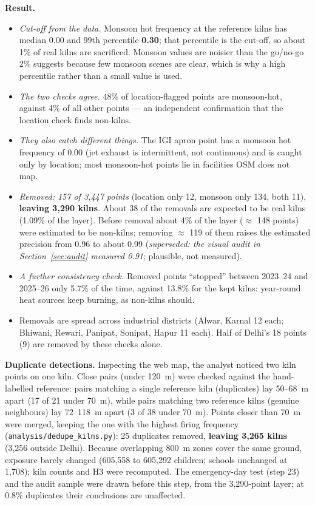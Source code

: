 \documentclass[11pt,a4paper]{article}
\begin{document}
\textbf{Result.}
\begin{itemize}[leftmargin=*]
\item \emph{Cut-off from the data.} Monsoon hot frequency at the reference kilns
has median 0.00 and 99th percentile \textbf{0.30}; that percentile is the
cut-off, so about 1\% of real kilns are sacrificed. Monsoon values are noisier
than the go/no-go 2\% suggests because few monsoon scenes are clear, which is
why a high percentile rather than a small value is used.
\item \emph{The two checks agree.} 48\% of location-flagged points are
monsoon-hot, against 4\% of all other points --- an independent confirmation
that the location check finds non-kilns.
\item \emph{They also catch different things.} The IGI apron point has a monsoon
hot frequency of 0.00 (jet exhaust is intermittent, not continuous) and is caught
only by location; most monsoon-hot points lie in facilities OSM does not map.
\item \emph{Removed: 157 of 3{,}447 points} (location only 12, monsoon only 134,
both 11), \textbf{leaving 3{,}290 kilns}. About 38 of the removals are expected
to be real kilns (1.09\% of the layer). Before removal about 4\% of the layer
($\approx$ 148 points) were estimated to be non-kilns; removing $\approx$ 119
of them raises the estimated precision from 0.96 to about 0.99 (\emph{superseded:
the visual audit in Section~\ref{sec:audit} measured 0.91}; plausible, not
measured).
\item \emph{A further consistency check.} Removed points ``stopped'' between
2023--24 and 2025--26 only 5.7\% of the time, against 13.8\% for the kept
kilns: year-round heat sources keep burning, as non-kilns should.
\item Removals are spread across industrial districts (Alwar, Karnal 12 each;
Bhiwani, Rewari, Panipat, Sonipat, Hapur 11 each). Half of Delhi's 18 points
(9) are removed by these checks alone.
\end{itemize}
\textbf{Duplicate detections.} Inspecting the web map, the analyst noticed two
kiln points on one kiln. Close pairs (under 120~m) were checked against the
hand-labelled reference: pairs matching a single reference kiln (duplicates) lay
50--68~m apart (17 of 21 under 70~m), while pairs matching two reference kilns
(genuine neighbours) lay 72--118~m apart (3 of 38 under 70~m). Points closer
than 70~m were merged, keeping the one with the highest firing frequency
(\texttt{analysis/dedupe\_kilns.py}): 25 duplicates removed, \textbf{leaving
3{,}265 kilns} (3{,}256 outside Delhi). Because overlapping 800~m zones cover
the same ground, exposure barely changed (605{,}558 to 605{,}292 children;
schools unchanged at 1{,}708); kiln counts and H3 were recomputed. The
emergency-day test (step 23) and the audit sample were drawn before this step,
from the 3{,}290-point layer; at 0.8\% duplicates their conclusions are
unaffected.
\end{document}
